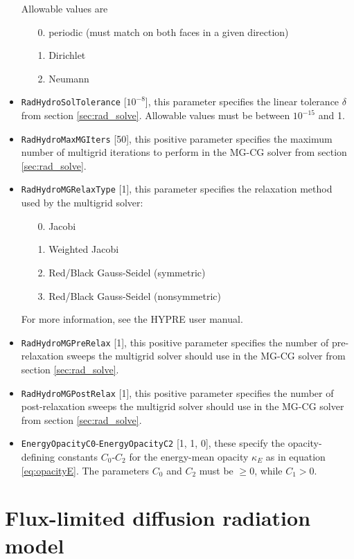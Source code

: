 \documentclass[letterpaper,10pt]{article}
\renewcommand{\(}{\left(}
\renewcommand{\)}{\right)}
\begin{document}
\begin{itemize}
  Allowable values are
  \begin{itemize}
  \item[0.] periodic (must match on both faces in a given direction)
  \item[1.] Dirichlet
  \item[2.] Neumann
  \end{itemize}
\item {\tt RadHydroSolTolerance} [$10^{-8}$], this parameter
  specifies the linear tolerance $\delta$ from section
  \ref{sec:rad_solve}.  Allowable values must be between $10^{-15}$ and 1.
\item {\tt RadHydroMaxMGIters} [50], this positive parameter
  specifies the maximum number of multigrid iterations to perform in
  the MG-CG solver from section \ref{sec:rad_solve}.
\item {\tt RadHydroMGRelaxType} [1], this parameter specifies the
  relaxation method used by the multigrid solver:
  \begin{itemize}
  \item[0.] Jacobi
  \item[1.] Weighted Jacobi
  \item[2.] Red/Black Gauss-Seidel (symmetric)
  \item[3.] Red/Black Gauss-Seidel (nonsymmetric)
  \end{itemize}
  For more information, see the HYPRE user manual.
\item {\tt RadHydroMGPreRelax} [1], this positive parameter
  specifies the number of pre-relaxation sweeps the multigrid solver
  should use in the MG-CG solver from section \ref{sec:rad_solve}.
\item {\tt RadHydroMGPostRelax} [1], this positive parameter
  specifies the number of post-relaxation sweeps the multigrid solver
  should use in the MG-CG solver from section \ref{sec:rad_solve}.
\item {\tt EnergyOpacityC0}-{\tt EnergyOpacityC2} [1, 1, 0],
  these specify the opacity-defining constants $C_0$-$C_2$ for the
  energy-mean opacity $\kappa_E$ as in equation \eqref{eq:opacityE}.
  The parameters $C_0$ and $C_2$ must be $\ge 0$, while $C_1> 0$.
\end{itemize}





\section{Flux-limited diffusion radiation model}
\label{sec:rad_model}
\end{document}
